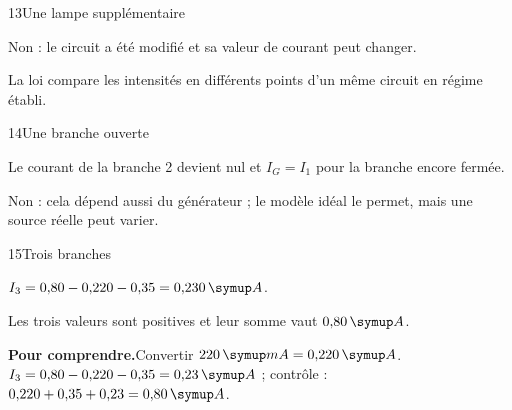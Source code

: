 \par\noindent\begin{minipage}{\linewidth}
\begin{corrige}{13}{Une lampe supplémentaire}
\begin{questions}
\item Non : le circuit a été modifié et sa valeur de courant peut changer.
\item La loi compare les intensités en différents points d’un même circuit en régime établi.
\end{questions}
\end{corrige}
\end{minipage}
\par\noindent\begin{minipage}{\linewidth}
\begin{corrige}{14}{Une branche ouverte}
\begin{questions}
\item Le courant de la branche 2 devient nul et $I_G=I_1$ pour la branche encore fermée.
\item Non : cela dépend aussi du générateur ; le modèle idéal le permet, mais une source réelle peut varier.
\end{questions}
\end{corrige}
\end{minipage}
\par\noindent\begin{minipage}{\linewidth}
\begin{corrige}{15}{Trois branches}
\begin{questions}
\item $I_3=0{,}80-0{,}220-0{,}35=0{,}230\unite A$.
\item Les trois valeurs sont positives et leur somme vaut $0{,}80\unite A$.
\end{questions}
\par\smallskip\noindent\textbf{Pour comprendre.}\enspace Convertir $220\unite{mA}=0{,}220\unite A$. $I_3=0{,}80-0{,}220-0{,}35=0{,}23\unite A$ ; contrôle : $0{,}220+0{,}35+0{,}23=0{,}80\unite A$.\par
{}
\end{corrige}
\end{minipage}
